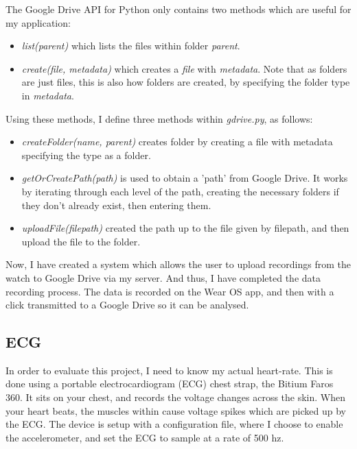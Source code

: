 \documentclass[12pt,a4paper,twoside,openany]{report}
\begin{document}
The Google Drive API for Python only contains two methods which are useful for
my application:

\begin{itemize}
	\item \emph{list(parent)} which lists the files within folder
		\emph{parent}.

	\item \emph{create(file, metadata)} which creates a \emph{file} with
		\emph{metadata}. Note that as folders
		are just files, this is also how folders are created, by
		specifying the folder type in \emph{metadata}.
\end{itemize}

Using these methods, I define three methods within \emph{gdrive.py}, as follows:

\begin{itemize}
	\item \emph{createFolder(name, parent)} creates folder by creating a
		file with metadata specifying the type as a folder.

	\item \emph{getOrCreatePath(path)} is used to obtain a 'path' from Google
		Drive. It works by iterating through each level of the path,
		creating the necessary folders if they don't already exist,
		then entering them.

	\item \emph{uploadFile(filepath)} created the path up to the file
		given by filepath, and then upload the file to the folder.
\end{itemize}

Now, I have created a system which allows the user to upload recordings from
the watch to Google Drive via my server. And thus, I have completed the data
recording process. The data is recorded on the Wear OS app, and then with a
click transmitted to a Google Drive so it can be analysed.


\subsection{ECG}

In order to evaluate this project, I need to know my actual heart-rate. This
is done using a portable electrocardiogram (ECG) chest strap, the Bitium Faros
360. It sits on your chest, and records the voltage changes across the skin.
When your heart beats, the muscles within cause voltage spikes which are
picked up by the ECG. The device is setup with a configuration 
file, where I choose to enable
the accelerometer, and set the ECG to sample at a rate of 500 hz.
\end{document}
